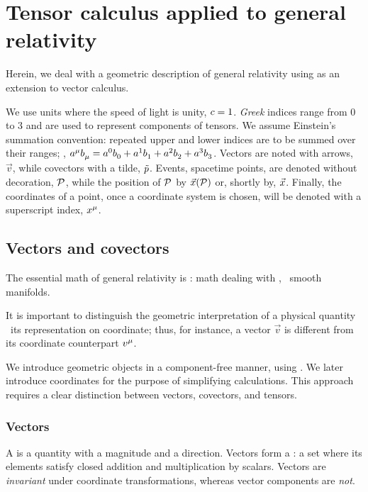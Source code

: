 
\section{Tensor calculus applied to general relativity}

Herein, we deal with a geometric description of general relativity using  as an extension to vector calculus.

We use units where the speed of light is unity, $c = 1$. \emph{Greek} indices range from 0 to 3 and are used to represent components of tensors. We assume Einstein's summation convention: repeated upper and lower indices are to be summed over their ranges; \eg, $\tvec a\mu\tcov b\mu = \tvec a0\tcov b0 + \tvec a1\tcov b1 + \tvec a2\tcov b2 + \tvec a3\tcov b3$. Vectors are noted with arrows, $\vec v$, while covectors with a tilde, $\tilde{p}$. Events, spacetime points, are denoted without decoration, $\event P$, while the position of $\event P$ by $\vec\pos\vat{\event P}$ or, shortly by, $\vec{x}$. Finally, the coordinates of a point, once a coordinate system is chosen, will be denoted with a superscript index, $\tepos\mu$.


\subsection{Vectors and covectors}

The essential math of general relativity is : math dealing with , \aka\ smooth manifolds.

It is important to distinguish the geometric interpretation of a physical quantity \vs\ its representation on coordinate; thus, for instance, a vector $\vec v$ is different from its coordinate counterpart $\tvec v\mu$.

We introduce geometric objects in a component-free manner, using . We later introduce coordinates for the purpose of simplifying calculations. This approach requires a clear distinction between vectors, covectors, and tensors.


\subsubsection{Vectors}

A  is a quantity with a magnitude and a direction. Vectors form a : a set where its elements satisfy closed addition and multiplication by scalars. Vectors are \emph{invariant} under coordinate transformations, whereas vector components are \emph{not}.


